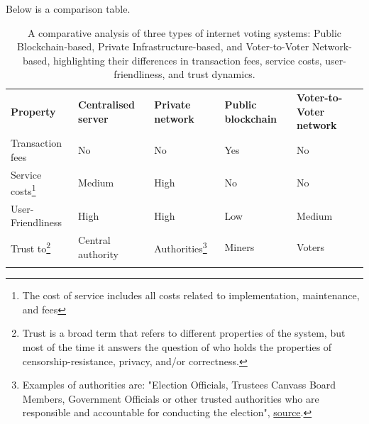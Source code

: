 \documentclass{article}
\begin{document}
Below is a comparison table.

\newcommand{\fullmoon}{\tikz\filldraw[fill=black] (0,0) circle (0.5em);}
\newcommand{\newmoon}{\tikz\draw (0,0) circle (0.5em);}
\newcommand{\rightmoon}{\tikz\draw (0,0) circle (0.5em); \filldraw[fill=black] (0,0) arc (90:270:0.5em) -- cycle;}
\newcommand{\leftmoon}{\tikz\draw (0,0) circle (0.5em); \filldraw[fill=black] (0,0) arc (270:90:0.5em) -- cycle;}
\newcommand{\halfmoon}{\tikz\draw (0,0) circle (0.5em); \filldraw[fill=black] (0,-0.5em) rectangle (0,0.5em);}


\begin{table}[!h]
\centering
\newcommand{\YES}{\cellcolor{red!50}Yes}
\newcommand{\NO}{\cellcolor{green!50}No}
\caption{A comparative analysis of three types of internet voting systems: Public Blockchain-based, Private Infrastructure-based, and Voter-to-Voter Network-based, highlighting their differences in transaction fees, service costs, user-friendliness, and trust dynamics.}
\begin{tabular}{p{}p{}p{}p{}p{}}
\noalign{\smallskip}\hline\noalign{\smallskip}
\textbf{Property} & \textbf{Centralised server} & \textbf{Private network} & \textbf{Public blockchain} & \textbf{Voter-to-Voter network}\\
\noalign{\smallskip}\hline\noalign{\smallskip}
Transaction fees & \NO & \NO & \YES & \NO \\
\hline
Service costs\footnote{The cost of service includes all costs related to implementation, maintenance, and fees} & \cellcolor{yellow!50} Medium & \cellcolor{red!50} High & \cellcolor{green!50} No  & \cellcolor{green!50} No \\
\hline
User-Friendliness & \cellcolor{green!50} High & \cellcolor{green!50}High & \cellcolor{red!50} Low & \cellcolor{yellow!50} Medium \\
\hline
Trust to\footnote{Trust is a broad term that refers to different properties of the system, but most of the time it answers the question of who holds the properties of censorship-resistance, privacy, and/or correctness.} & \cellcolor{red!50} Central authority & \cellcolor{yellow!50} Authorities\footnote{Examples of authorities are: "Election Officials, Trustees Canvass Board Members, Government Officials or other trusted authorities who are responsible and accountable for conducting the election", \href{http://www.electionguard.vote/basics/steps/1_Key_Ceremony/}{source}.} & \cellcolor{yellow!50} Miners & \cellcolor{yellow!50} Voters  \\
\noalign{\smallskip}\hline

\hline
\end{tabular}
\end{table}
\end{document}
